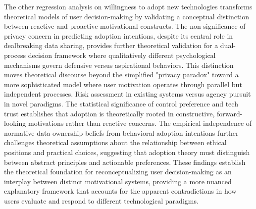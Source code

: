 	The other regression analysis on willingness to adopt new technologies transforms theoretical models of user decision-making by validating a conceptual distinction between reactive and proactive motivational constructs. The non-significance of privacy concern in predicting adoption intentions, despite its central role in dealbreaking data sharing, provides further theoretical validation for a dual-process decision framework where qualitatively different psychological mechanisms govern defensive versus aspirational behaviors. This distinction moves theoretical discourse beyond the simplified "privacy paradox" toward a more sophisticated model where user motivation operates through parallel but independent processes. Risk assessment in existing systems versus agency pursuit in novel paradigms. The statistical significance of control preference and tech trust establishes that adoption is theoretically rooted in constructive, forward-looking motivations rather than reactive concerns. The empirical independence of normative data ownership beliefs from behavioral adoption intentions further challenges theoretical assumptions about the relationship between ethical positions and practical choices, suggesting that adoption theory must distinguish between abstract principles and actionable preferences. These findings establish the theoretical foundation for reconceptualizing user decision-making as an interplay between distinct motivational systems, providing a more nuanced explanatory framework that accounts for the apparent contradictions in how users evaluate and respond to different technological paradigms.

